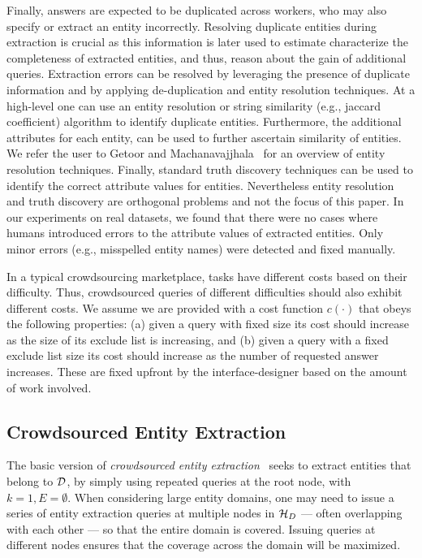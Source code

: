 \iftr
Finally, answers are expected to be duplicated across workers, who may also specify or extract an entity incorrectly. Resolving duplicate entities during extraction is crucial as this information is later used to estimate characterize the completeness of extracted entities, and thus, reason about the gain of additional queries.  Extraction errors can be resolved by leveraging the presence of duplicate information and by applying de-duplication and entity resolution techniques. At a high-level one can use an entity resolution or string similarity (e.g., jaccard coefficient) algorithm to identify duplicate entities. Furthermore, the additional attributes for each entity, can be used to further ascertain similarity of entities. We refer the user to Getoor and Machanavajjhala~\cite{getoor:kdd13} for an overview of entity resolution techniques. Finally, standard truth discovery techniques can be used to identify the correct attribute values for entities. Nevertheless entity resolution and truth discovery are orthogonal problems and not the focus of this paper. In our experiments on real datasets, we found that there were no cases where humans introduced errors to the attribute values of extracted entities. Only minor errors (e.g., misspelled entity names) were detected and fixed manually. \fi

 In a typical crowdsourcing marketplace, tasks have different costs based on their difficulty. Thus, crowdsourced queries of different difficulties should also exhibit different costs. We assume we are provided with a cost function $c(\cdot)$ that obeys the following properties:  (a) given a query with fixed size its cost should increase as the size of its exclude list is increasing, and (b) given a query with a fixed exclude list size its cost should increase as the number of requested answer increases. These are fixed upfront by the interface-designer based on the amount of work involved.

\subsection{Crowdsourced Entity Extraction}
\label{sec:extraction}
The basic version of {\em crowdsourced entity extraction}~\cite{trushkowsky:2013} seeks to extract entities that belong to $\mathcal{D}$, by simply using repeated queries at the root node, with $k = 1, E = \emptyset$. When considering large entity domains, one may need to issue a series of entity extraction queries at multiple nodes in  $\mathcal{H}_D$ --- often overlapping with each other --- so that the entire domain is covered. Issuing queries at different nodes ensures that the coverage across the domain will be maximized. 


